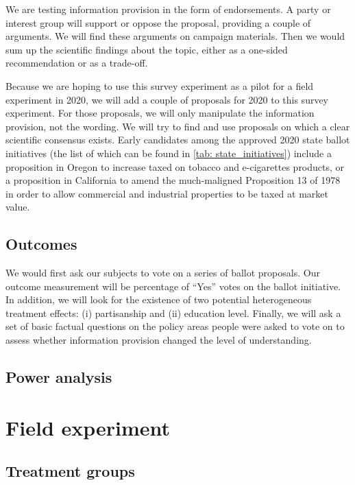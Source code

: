 \documentclass[12pt,final,fleqn]{article}
\theoremstyle{plain}
\begin{document}
We are testing information provision in the form of endorsements. A party or interest group will support or oppose the proposal, providing a couple of arguments. We will find these arguments on campaign materials. Then we would sum up the scientific findings about the topic, either as a one-sided recommendation or as a trade-off. 

Because we are hoping to use this survey experiment as a pilot for a field experiment in 2020, we will add a couple of proposals for 2020 to this survey experiment. For those proposals, we will only manipulate the information provision, not the wording. We will try to find and use proposals on which a clear scientific consensus exists. Early candidates among the approved 2020 state ballot initiatives (the list of which can be found in \autoref{tab: state_initiatives}) include a proposition in Oregon to increase taxed on tobacco and e-cigarettes products, or a proposition in California to amend the much-maligned Proposition 13 of 1978 in order to allow commercial and industrial properties to be taxed at market value. 



\subsection{Outcomes} \label{sec: Outcomes}

We would first ask our subjects to vote on a series of ballot proposals. Our outcome measurement will be percentage of ``Yes'' votes on the ballot initiative. In addition, we will look for the existence of two potential heterogeneous treatment effects: (i) partisanship and (ii) education level. Finally, we will ask a set of basic factual questions on the policy areas people were asked to vote on to assess whether information provision changed the level of understanding. 



\subsection{Power analysis} \label{sec: power}




\section{Field experiment} \label{sec:Design survey}


\subsection{Treatment groups} \label{sec: treatment_groups}
\end{document}
